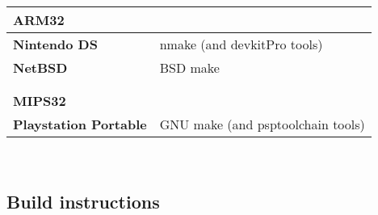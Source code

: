 \begin{tabular}{l l}
{\bf{\large ARM32}} &                                               \\
\hline\hline
{\bf Nintendo DS}   & nmake (and devkitPro\cite{devkitPro} tools)   \\
{\bf NetBSD}        & BSD make                                      \\
\hline
                    &                                               \\
                    &                                               \\

{\bf{\large MIPS32}} &                                              \\
\hline\hline
{\bf Playstation Portable} & GNU make (and psptoolchain\cite{psptoolchain} tools) \\
\hline

\end{tabular}\\

\pagebreak

\subsection{Build instructions}


